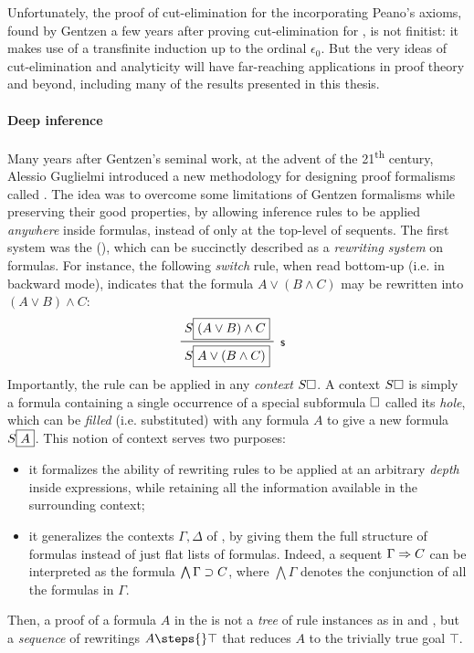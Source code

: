 Unfortunately, the proof of cut-elimination for the 
incorporating Peano's axioms, found by Gentzen a few years after proving
cut-elimination for  , is
not finitist: it makes use of a transfinite induction up to the ordinal
$\epsilon_0$. But the very ideas of cut-elimination and analyticity will have
far-reaching applications in proof theory and beyond, including many of the
results presented in this thesis.

\paragraph{Deep inference}

Many years after Gentzen's seminal work, at the advent of the
21\textsuperscript{th} century, Alessio Guglielmi introduced a new methodology
for designing proof formalisms called 
. The idea was to overcome some limitations of
Gentzen formalisms while preserving their good properties, by allowing inference
rules to be applied \emph{anywhere} inside formulas, instead of only at the
top-level of sequents. The
first  system was the 
(), which can be succinctly described as a \emph{rewriting system}
on formulas. For instance, the following \emph{switch} rule, when read bottom-up
(i.e. in backward mode), indicates that the formula $A \lor (B \land C)$ may be
rewritten into $(A \lor B) \land C$:
$$\R[\rsf{s}]{S\select{(A \lor B) \land C}}{S\select{A \lor (B \land C)}}$$
Importantly, the rule can be applied in any \emph{context} $S\square$. A context
$S\square$ is simply a formula containing a single occurrence of a special
subformula $\square$ called its \emph{hole}, which can be \emph{filled} (i.e.
substituted) with any formula $A$ to give a new formula $S\fbox{$A$}$. This
notion of context serves two purposes:
\begin{itemize}
  \item it formalizes the ability of rewriting rules to be applied at an
  arbitrary \emph{depth} inside expressions, while retaining all the information
  available in the surrounding context;
  \item it generalizes the contexts $\Gamma, \Delta$ of , by
  giving them the full structure of formulas instead of just flat lists of
  formulas. Indeed, a sequent $\Gamma \Rightarrow C$ can be interpreted as the formula
  $\bigwedge \Gamma \supset C$, where $\bigwedge \Gamma$ denotes the conjunction
  of all the formulas in $\Gamma$.
\end{itemize}
Then, a proof of a formula $A$ in the  is not a
\emph{tree} of rule instances as in  and , but
a \emph{sequence} of rewritings $A \steps{} \top$ that reduces $A$ to the
trivially true goal $\top$.

